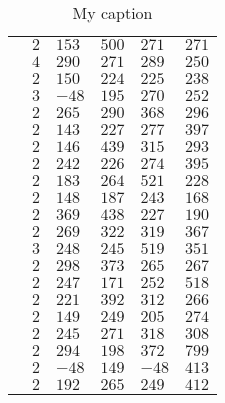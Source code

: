 \documentclass[12pt]{article}
\begin{document}
\begin{table}[]
\begin{tabular}{|l|l|l|l|l|l|}
                & $2$ & $153$ & $500$ & $271$ & $271$ \\
                & $4$ & $290$ & $271$ & $289$ & $250$ \\
                & $2$ & $150$ & $224$ & $225$ & $238$ \\
                & $3$ & $-48$ & $195$ & $270$ & $252$ \\
                & $2$ & $265$ & $290$ & $368$ & $296$ \\
                & $2$ & $143$ & $227$ & $277$ & $397$ \\
                & $2$ & $146$ & $439$ & $315$ & $293$ \\
                & $2$ & $242$ & $226$ & $274$ & $395$ \\
                & $2$ & $183$ & $264$ & $521$ & $228$ \\
                & $2$ & $148$ & $187$ & $243$ & $168$ \\
                & $2$ & $369$ & $438$ & $227$ & $190$ \\
                & $2$ & $269$ & $322$ & $319$ & $367$ \\
                & $3$ & $248$ & $245$ & $519$ & $351$ \\
                & $2$ & $298$ & $373$ & $265$ & $267$ \\
                & $2$ & $247$ & $171$ & $252$ & $518$ \\
                & $2$ & $221$ & $392$ & $312$ & $266$ \\
                & $2$ & $149$ & $249$ & $205$ & $274$ \\
                & $2$ & $245$ & $271$ & $318$ & $308$ \\
                & $2$ & $294$ & $198$ & $372$ & $799$ \\
                & $2$ & $-48$ & $149$ & $-48$ & $413$ \\
                & $2$ & $192$ & $265$ & $249$ & $412$
\end{tabular}
\caption{My caption}
\label{Complete test results per  starting values; \alpha = 0.10, nrAgents =10, nrMachines = 3}
\end{table}
\end{document}
